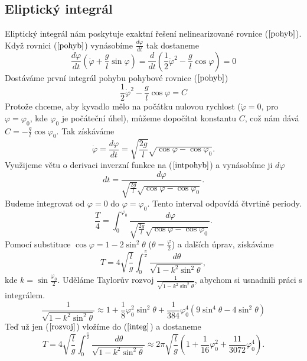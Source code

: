 \subsection{Eliptický integrál}
\label{sec:Eliptický integrál}
Eliptický integrál nám poskytuje exaktní řešení nelinearizované rovnice ($\ref{pohyb}$). Když rovnici ($\ref{pohyb}$) vynásobíme $\frac{d\varphi}{dt}$ tak dostaneme
\begin{equation*}
\frac{d\varphi}{dt}\left(\ddot{\varphi}+\frac{g}{l}\sin\varphi\right)=\frac{d}{dt}\left(\frac{1}{2}\dot{\varphi}^2-\frac{g}{l}\cos\varphi\right)=0
\end{equation*}
Dostáváme první integrál pohybu pohybové rovnice ($\ref{pohyb}$)
\begin{equation}
\frac{1}{2}\dot{\varphi}^2-\frac{g}{l}\cos\varphi=C
\end{equation}
Protože chceme, aby kyvadlo mělo na počátku nulovou rychlost ($\dot{\varphi}=0$, pro $\varphi=\varphi_0$, kde $\varphi_0$ je počáteční úhel), můžeme dopočítat konstantu $C$, což nám dává $C=-\frac{g}{l}\cos\varphi_0$. Tak získáváme
\begin{equation}
\label{intpohyb}
\dot{\varphi}=\frac{d\varphi}{dt}=\sqrt{\frac{2g}{l}}\sqrt{\cos\varphi-\cos\varphi_0}.
\end{equation}
Využijeme větu o derivaci inverzní funkce na ($\ref{intpohyb}$) a vynásobíme ji $d\varphi$
\begin{equation}
dt=\frac{d\varphi}{\sqrt{\frac{2g}{l}}\sqrt{\cos\varphi-\cos\varphi_0}}.
\end{equation}
Budeme integrovat od $\varphi=0$ do $\varphi=\varphi_0$. Tento interval odpovídá čtvrtině periody.
\begin{equation}
\frac{T}{4}=\int_{0}^{\varphi_0}\frac{\,d\varphi}{\sqrt{\frac{2g}{l}}\sqrt{\cos\varphi-\cos\varphi_0}}.
\end{equation}
Pomocí substituce $\cos\varphi=1-2\sin^2\theta$ ($\theta=\frac{\varphi}{2}$) a dalších úprav, získáváme
\begin{equation}
\label{integ}
T=4\sqrt{\frac{l}{g}}\int_{0}^{\frac{\pi}{2}}\frac{\,d\theta}{\sqrt{1-k^2\sin^2\theta}},
\end{equation}
kde $k=\sin\frac{\varphi_0}{2}$.
Uděláme Taylorův rozvoj $\frac{1}{\sqrt{1-k^2\sin^2\theta}}$, abychom si usnadnili práci s integrálem.
\begin{equation}
\label{rozvoj}
\frac{1}{\sqrt{1-k^2\sin^2\theta}}\approx1+\frac{1}{8} \varphi_0 ^2 \sin ^2\theta+\frac{1}{384} \varphi_0 ^4 \left(9 \sin ^4\theta-4 \sin
   ^2\theta \right)
\end{equation}
Teď už jen ($\ref{rozvoj}$) vložíme do ($\ref{integ}$) a dostaneme
\begin{equation}
T=4\sqrt{\frac{l}{g}}\int_{0}^{\frac{\pi}{2}}\frac{\,d\theta}{\sqrt{1-k^2\sin^2\theta}}\approx2\pi\sqrt{\frac{l}{g}}\left(1+\frac{1}{16}\varphi_0^2+\frac{11}{3072}\varphi_0^4\right).
\end{equation}

